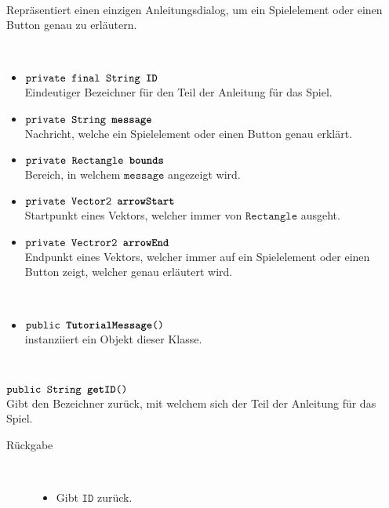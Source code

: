 \begin{description}
\item[Beschreibung] \hfill \\ Repräsentiert einen einzigen Anleitungsdialog, um ein Spielelement oder einen Button genau zu erläutern.
\item[Attribute] \hfill \\
	\vspace{-.8cm}
	\begin{itemize}	
		\item $\texttt{private final String \textbf{ID}}$ \\ Eindeutiger Bezeichner für den Teil der Anleitung für das Spiel.
		\item $\texttt{private String \textbf{message}}$ \\ Nachricht, welche ein Spielelement oder einen Button genau erklärt.
		\item $\texttt{private Rectangle \textbf{bounds}}$ \\ Bereich, in welchem $\texttt{message}$ angezeigt wird.
		\item $\texttt{private Vector2 \textbf{arrowStart}}$ \\ Startpunkt eines Vektors, welcher immer von $\texttt{Rectangle}$ ausgeht.
		\item $\texttt{private Vectror2 \textbf{arrowEnd}}$ \\ Endpunkt eines Vektors, welcher immer auf ein Spielelement oder einen Button zeigt, welcher genau erläutert wird.

		\end{itemize}
	
\item[Konstruktoren] \hfill \\
	\vspace{-.8cm}
	\begin{itemize}
		\item $\texttt{public \textbf{TutorialMessage}()}$ \\ instanziiert ein Objekt dieser Klasse.

	\end{itemize}
	
\item[Methoden] \hfill \\
	\vspace{-.8cm}
		\item $\texttt{public String \textbf{getID}()}$ \\ Gibt den Bezeichner zurück, mit welchem sich der Teil der Anleitung für das Spiel.
		\begin{description}
			\item[Rückgabe] \hfill \\
			\vspace{-.8cm}
			\begin{itemize}
				\item Gibt $\texttt{ID}$ zurück.
			\end{itemize}
			\end{description}
			

\end{description}
